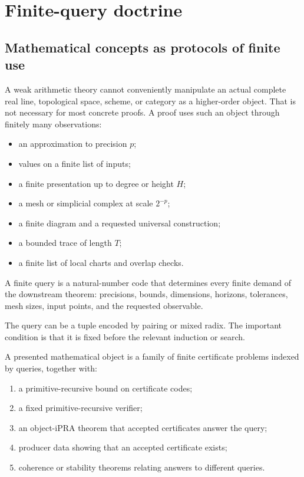 \section{Finite-query doctrine}

\subsection{Mathematical concepts as protocols of finite use}

A weak arithmetic theory cannot conveniently manipulate an actual complete
real line, topological space, scheme, or category as a higher-order object.
That is not necessary for most concrete proofs.  A proof uses such an object
through finitely many observations:

\begin{itemize}
\item an approximation to precision \(p\);
\item values on a finite list of inputs;
\item a finite presentation up to degree or height \(H\);
\item a mesh or simplicial complex at scale \(2^{-p}\);
\item a finite diagram and a requested universal construction;
\item a bounded trace of length \(T\);
\item a finite list of local charts and overlap checks.
\end{itemize}

\begin{definition}
A finite query is a natural-number code that determines every finite demand of
the downstream theorem: precisions, bounds, dimensions, horizons, tolerances,
mesh sizes, input points, and the requested observable.
\end{definition}

The query can be a tuple encoded by pairing or mixed radix.  The important
condition is that it is fixed before the relevant induction or search.

\begin{definition}
A presented mathematical object is a family of finite certificate problems
indexed by queries, together with:
\begin{enumerate}
\item a primitive-recursive bound on certificate codes;
\item a fixed primitive-recursive verifier;
\item an object-iPRA theorem that accepted certificates answer the query;
\item producer data showing that an accepted certificate exists;
\item coherence or stability theorems relating answers to different queries.
\end{enumerate}
\end{definition}

